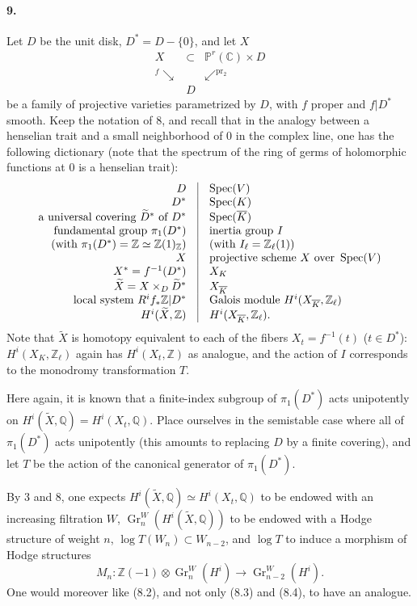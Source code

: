 \documentclass[10pt]{article}
\newcommand{\C}{\mathbb C}
\newcommand{\Q}{\mathbb Q}
\newcommand{\Z}{\mathbb Z}
\newcommand{\Zl}{\mathbb Z_\ell}
\newcommand{\Gr}{\operatorname{Gr}}
\newcommand{\Spec}{\operatorname{Spec}}
\newcommand{\pr}{\operatorname{pr}}
\newcommand{\barK}{\overline{K}}
\newcommand{\wt}{\widetilde}
\begin{document}
\paragraph{9.} Let $D$ be the unit disk, $D^*=D-\{0\}$, and let $X$
\[
\begin{array}{ccc}
X&\subset&\mathbb P^r(\C)\times D\\[-0.2em]
{}^{f}\searrow&&\swarrow^{\pr_2}\\[-0.2em]
& D&
\end{array}
\]
be a family of projective varieties parametrized by $D$, with $f$ proper and $f|D^*$ smooth. Keep the notation of 8, and recall that in the analogy between a henselian trait and a small neighborhood of $0$ in the complex line, one has the following dictionary (note that the spectrum of the ring of germs of holomorphic functions at $0$ is a henselian trait):
\[
\begin{array}{r@{\quad\vrule\quad}l}
D & \Spec(V)\\
D^* & \Spec(K)\\
\text{a universal covering }\wt D^*\text{ of }D^* & \Spec(\barK)\\
\text{fundamental group }\pi_1(D^*) & \text{inertia group }I\\
\text{(with }\pi_1(D^*)=\Z\simeq\Z(1)_\Z\text{)} & \text{(with }I_\ell=\Zl(1)\text{)}\\
X & \text{projective scheme }X\text{ over }\Spec(V)\\
X^*=f^{-1}(D^*) & X_K\\
\wt X=X\times_D\wt D^* & X_{\barK}\\
\text{local system }R^if_*\Z|D^* & \text{Galois module }H^i(X_{\barK},\Zl)\\
H^i(\wt X,\Z) & H^i(X_{\barK},\Zl).
\end{array}
\]
Note that $\wt X$ is homotopy equivalent to each of the fibers $X_t=f^{-1}(t)$ ($t\in D^*$): $H^i(X_K,\Zl)$ again has $H^i(X_t,\Z)$ as analogue, and the action of $I$ corresponds to the monodromy transformation $T$.

Here again, it is known that a finite-index subgroup of $\pi_1(D^*)$ acts unipotently on $H^i(\wt X,\Q)=H^i(X_t,\Q)$. Place ourselves in the semistable case where all of $\pi_1(D^*)$ acts unipotently (this amounts to replacing $D$ by a finite covering), and let $T$ be the action of the canonical generator of $\pi_1(D^*)$.

By 3 and 8, one expects $H^i(\wt X,\Q)\simeq H^i(X_t,\Q)$ to be endowed with an increasing filtration $W$, $\Gr_n^W(H^i(\wt X,\Q))$ to be endowed with a Hodge structure of weight $n$, $\log T(W_n)\subset W_{n-2}$, and $\log T$ to induce a morphism of Hodge structures
\[
M_n:\Z(-1)\otimes\Gr_n^W(H^i)\longrightarrow\Gr_{n-2}^W(H^i).
\]
One would moreover like (8.2), and not only (8.3) and (8.4), to have an analogue.
\end{document}
